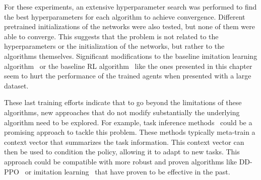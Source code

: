 For these experiments, an extensive hyperparameter search was performed to find the best hyperparameters for each algorithm to achieve convergence.
Different pretrained initializations of the networks were also tested, but none of them were able to converge.
This suggests that the problem is not related to the hyperparameters or the initialization of the networks, but rather to the algorithms themselves.
Significant modifications to the baseline imitation learning algorithm~\cite{ramrakhya2023} or the baseline RL algorithm~\cite{wijmans2020} like the ones presented in this chapter seem to hurt the performance of the trained agents when presented with a large dataset.

These last training efforts indicate that to go beyond the limitations of these algorithms, new approaches that do not modify substantially the underlying algorithm need to be explored.
For example, task inference methods~\cite{Beck_2025} could be a promising approach to tackle this problem.
These methods typically meta-train a context vector that summarizes the task information.
This context vector can then be used to condition the policy, allowing it to adapt to new tasks.
This approach could be compatible with more robust and proven algorithms like DD-PPO~\cite{wijmans2020} or imitation learning~\cite{ramrakhya2023} that have proven to be effective in the past.